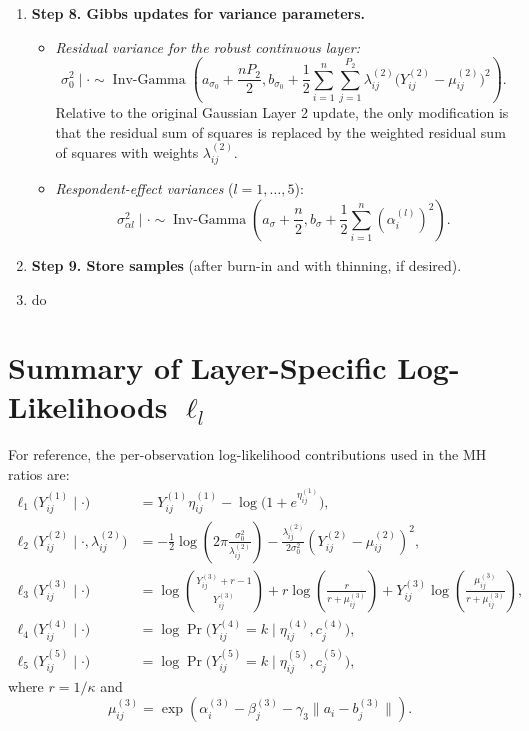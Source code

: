 \documentclass[11pt]{article}
\begin{document}
\begin{enumerate}[leftmargin=1.8em]
    \item \textbf{Step 8. Gibbs updates for variance parameters.}

    \begin{itemize}[leftmargin=1.5em]
        \item[(a)] \textit{Residual variance for the robust continuous layer:}
        \[
        \sigma_0^2\mid \cdot
        \sim
        \operatorname{Inv\text{-}Gamma}
        \left(
        a_{\sigma_0}+\frac{nP_2}{2},
        b_{\sigma_0}+\frac{1}{2}\sum_{i=1}^{n}\sum_{j=1}^{P_2}\lambda_{ij}^{(2)}\bigl(Y_{ij}^{(2)}-\mu_{ij}^{(2)}\bigr)^2
        \right).
        \]
        Relative to the original Gaussian Layer 2 update, the only modification is that the residual sum of squares is replaced by the weighted residual sum of squares with weights $\lambda_{ij}^{(2)}$.

        \item[(b)] \textit{Respondent-effect variances} ($l=1,\dots,5$):
        \[
        \sigma_{\alpha l}^2\mid \cdot
        \sim
        \operatorname{Inv\text{-}Gamma}
        \left(
        a_\sigma+\frac{n}{2},
        b_\sigma+\frac{1}{2}\sum_{i=1}^{n}(\alpha_i^{(l)})^2
        \right).
        \]
    \end{itemize}

    \item \textbf{Step 9. Store samples} (after burn-in and with thinning, if desired).

    \item[end] do
\end{enumerate}

\section{Summary of Layer-Specific Log-Likelihoods $\ell_l$}

For reference, the per-observation log-likelihood contributions used in the MH ratios are:
\begin{align*}
\ell_1\bigl(Y_{ij}^{(1)}\mid \cdot\bigr)
&= Y_{ij}^{(1)}\eta_{ij}^{(1)} - \log\bigl(1+e^{\eta_{ij}^{(1)}}\bigr), \\
\ell_2\bigl(Y_{ij}^{(2)}\mid \cdot,\lambda_{ij}^{(2)}\bigr)
&= -\frac{1}{2}\log\left(2\pi \frac{\sigma_0^2}{\lambda_{ij}^{(2)}}\right)
-\frac{\lambda_{ij}^{(2)}}{2\sigma_0^2}\left(Y_{ij}^{(2)}-\mu_{ij}^{(2)}\right)^2, \\
\ell_3\bigl(Y_{ij}^{(3)}\mid \cdot\bigr)
&= \log\binom{Y_{ij}^{(3)}+r-1}{Y_{ij}^{(3)}}
+ r\log\left(\frac{r}{r+\mu_{ij}^{(3)}}\right)
+ Y_{ij}^{(3)}\log\left(\frac{\mu_{ij}^{(3)}}{r+\mu_{ij}^{(3)}}\right), \\
\ell_4\bigl(Y_{ij}^{(4)}\mid \cdot\bigr)
&= \log \Pr\bigl(Y_{ij}^{(4)}=k\mid \eta_{ij}^{(4)}, c_j^{(4)}\bigr), \\
\ell_5\bigl(Y_{ij}^{(5)}\mid \cdot\bigr)
&= \log \Pr\bigl(Y_{ij}^{(5)}=k\mid \eta_{ij}^{(5)}, c_j^{(5)}\bigr),
\end{align*}
where $r=1/\kappa$ and
\[
\mu_{ij}^{(3)} = \exp\left(\alpha_i^{(3)} - \beta_j^{(3)} - \gamma_3\|a_i-b_j^{(3)}\|\right).
\]
\end{document}
